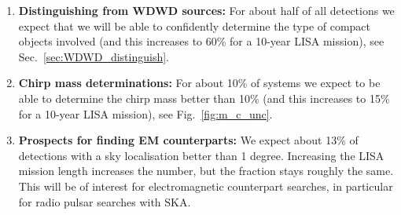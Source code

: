 \begin{enumerate}
    \item \textbf{Distinguishing from WDWD sources:} For about half of all detections we expect that we will be able to confidently determine the type of compact objects involved (and this increases to 60\% for a 10-year LISA mission), see Sec.~\ref{sec:WDWD_distinguish}.
    
    \item \textbf{Chirp mass determinations:} For about 10\% of systems we expect to be able to determine the chirp mass better than 10\% (and this increases to 15\% for a 10-year LISA mission), see Fig.~\ref{fig:m_c_unc}.
    
    
    \item \textbf{Prospects for finding EM counterparts:} We expect about 13\% of detections with a sky localisation better than 1 degree. Increasing the LISA mission length increases the number, but the fraction stays roughly the same. This will be of interest for electromagnetic counterpart searches, in particular for radio pulsar searches with SKA.      
    
    
    
 

\end{enumerate}

